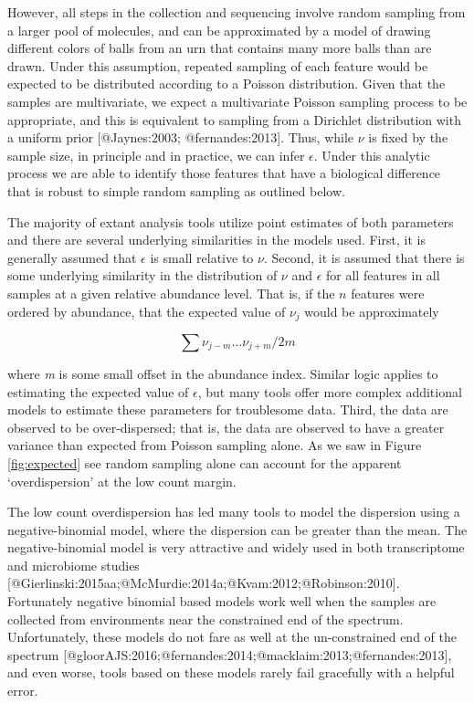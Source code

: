 \documentclass[
  onecolumn]{article}
\begin{document}
However, all steps in the collection and sequencing involve random sampling from a larger pool of molecules, and can be approximated by a model of drawing different colors of balls from an urn that contains many more balls than are drawn. Under this assumption, repeated sampling of each feature would be expected to be distributed according to a Poisson distribution. Given that the samples are multivariate, we expect a multivariate Poisson sampling process to be appropriate, and this is equivalent to sampling from a Dirichlet distribution with a uniform prior {[}@Jaynes:2003; @fernandes:2013{]}. Thus, while \(\nu\) is fixed by the sample size, in principle and in practice, we can infer \(\epsilon\). Under this analytic process we are able to identify those features that have a biological difference that is robust to simple random sampling as outlined below.

The majority of extant analysis tools utilize point estimates of both parameters and there are several underlying similarities in the models used. First, it is generally assumed that \(\epsilon\) is small relative to \(\nu\). Second, it is assumed that there is some underlying similarity in the distribution of \(\nu\) and \(\epsilon\) for all features in all samples at a given relative abundance level. That is, if the \(n\) features were ordered by abundance, that the expected value of \(\nu_j\) would be approximately

\begin{equation}
\sum \nu_{j-m} \ldots \nu_{j+m} / 2m
\end{equation}

where \textit{m} is some small offset in the abundance index. Similar logic applies to estimating the expected value of \(\epsilon\), but many tools offer more complex additional models to estimate these parameters for troublesome data. Third, the data are observed to be over-dispersed; that is, the data are observed to have a greater variance than expected from Poisson sampling alone. As we saw in Figure \ref{fig:expected} see random sampling alone can account for the apparent `overdispersion' at the low count margin.

The low count overdispersion has led many tools to model the dispersion using a negative-binomial model, where the dispersion can be greater than the mean. The negative-binomial model is very attractive and widely used in both transcriptome and microbiome studies {[}@Gierlinski:2015aa;@McMurdie:2014a;@Kvam:2012;@Robinson:2010{]}. Fortunately negative binomial based models work well when the samples are collected from environments near the constrained end of the spectrum. Unfortunately, these models do not fare as well at the un-constrained end of the spectrum {[}@gloorAJS:2016;@fernandes:2014;@macklaim:2013;@fernandes:2013{]}, and even worse, tools based on these models rarely fail gracefully with a helpful error.
\end{document}
